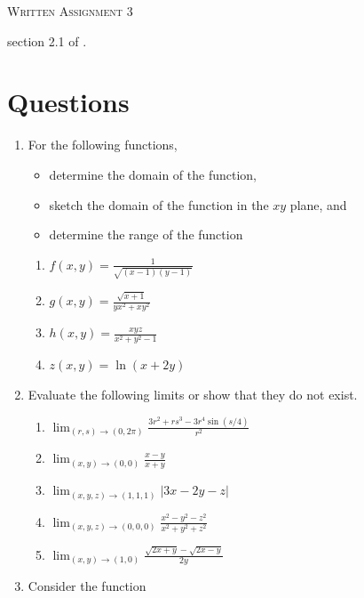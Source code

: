 \documentclass{article}
\date{}
\begin{document}
\begin{center}
\textsc{\LARGE Written Assignment 3}\\[0.5cm]
\end{center}
\From section 2.1 of \VCT.

\section*{Questions}

\begin{enumerate}
\item 
For the following functions, 
\begin{itemize}
\item determine the domain of the function,
\item sketch the domain of the function in the $xy$ plane, and
\item determine the range of the function
\end{itemize}
\begin{enumerate}
  \item $f(x,y) = \frac{1}{\sqrt{(x-1)(y-1)}}$
  \item $g(x,y) = \frac{\sqrt{x+1}}{yx^2+xy^2}$
  \item $h(x,y) = \frac{xyz}{x^2+y^2-1}$
  \item $z(x,y) = \ln(x+2y)$
\end{enumerate}
\item 
Evaluate the following limits or show that they do not exist.  
\begin{enumerate}
\item $\displaystyle \lim_{(r,s)\rightarrow(0,2\pi) } \frac{3r^2+rs^3-3r^4\sin (s/4)}{r^2}$
\item $\displaystyle \lim_{(x,y)\rightarrow(0,0) } \frac{x-y}{x+y}$
\item $\displaystyle \lim_{(x,y,z)\rightarrow(1,1,1)} \big|3x - 2y - z \big|$
\item $\displaystyle \lim_{(x,y,z)\rightarrow(0,0,0) } \frac{x^2-y^2-z^2}{x^2+y^2+z^2}$
\item $\displaystyle \lim_{(x,y)\rightarrow(1,0) } \frac{\sqrt{2x+y}-\sqrt{2x-y}}{2y}$
\end{enumerate}
\item 
Consider the function
\begin{align*}

\end{align*}
\end{enumerate}
\end{document}
